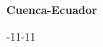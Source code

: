 \begin{espaciosimple}
    \hphantom{Hola!}

    \hphantom{Hola!}

    \hphantom{Hola!}

    \hphantom{Hola!}

    \hphantom{Hola!}

    \begin{center}
        {\fontsize{11}{13}\selectfont \textbf{Cuenca-Ecuador}} %

        {\fontsize{11}{13}-11-11} %
    \end{center}

\end{espaciosimple}

